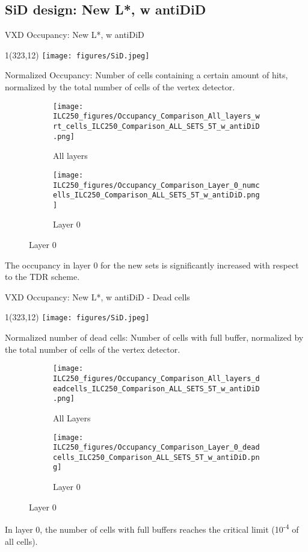 \documentclass[xcolor={dvipsnames}]{beamer}
\newcommand{\sidlogo}{
  \setlength{\TPHorizModule}{1pt}
  \setlength{\TPVertModule}{1pt}
  \begin{textblock}{1}(323,12)
   \texttt{[image: figures/SiD.jpeg]}
  \end{textblock}
  }
\begin{document}
\subsection{SiD design: New L*, w antiDiD}
\begin{frame}{VXD Occupancy: New L*, w antiDiD}
\sidlogo
\alert{Normalized Occupancy}: Number of cells containing a certain amount of hits, normalized by the total number of cells of the vertex detector.
 \begin{figure}
\centering
\begin{subfigure}[t]{0.48\textwidth}
\centering
\texttt{[image: ILC250\_figures/Occupancy\_Comparison\_All\_layers\_wrt\_cells\_ILC250\_Comparison\_ALL\_SETS\_5T\_w\_antiDiD.png]}
\caption{\alert{All layers}}
\end{subfigure}
\hspace*{0.2cm}
\begin{subfigure}[t]{0.48\textwidth}
\centering
 \texttt{[image: ILC250\_figures/Occupancy\_Comparison\_Layer\_0\_numcells\_ILC250\_Comparison\_ALL\_SETS\_5T\_w\_antiDiD.png]}
 \caption{\alert{Layer 0}}
\end{subfigure}
\end{figure}
The occupancy in layer 0 for the new sets is significantly increased with respect to the TDR scheme.
\end{frame}

\begin{frame}{VXD Occupancy: New L*, w antiDiD - Dead cells}
\sidlogo
\alert{Normalized number of dead cells}: Number of cells with full buffer, normalized by the total number of cells of the vertex detector.
\begin{figure}
\centering
\begin{subfigure}[t]{0.48\textwidth}
\centering
\texttt{[image: ILC250\_figures/Occupancy\_Comparison\_All\_layers\_deadcells\_ILC250\_Comparison\_ALL\_SETS\_5T\_w\_antiDiD.png]}
\caption{\alert{All Layers}}
 \end{subfigure}
\hspace*{0.2cm}
\begin{subfigure}[t]{0.48\textwidth}
\centering
 \texttt{[image: ILC250\_figures/Occupancy\_Comparison\_Layer\_0\_deadcells\_ILC250\_Comparison\_ALL\_SETS\_5T\_w\_antiDiD.png]}
\caption{\alert{Layer 0}}
\end{subfigure}
\end{figure}
In layer 0, the number of cells with full buffers reaches the critical limit (10\textsuperscript{-4} of all cells).
\end{frame}
\setcounter{tocdepth}{3}
\end{document}
